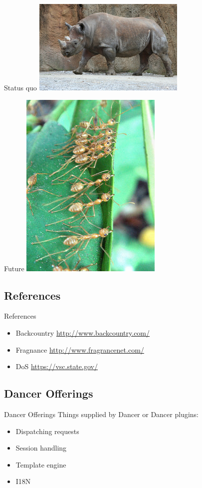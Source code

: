 
\begin{frame}{Status quo}
  \includegraphics{rhino.jpg}
\end{frame}

\begin{frame}{Future}
  \includegraphics{ants.jpg}
\end{frame}

\subsection{References}
\begin{frame}{References}
\begin{itemize}
\item Backcountry \url{http://www.backcountry.com/}
\item Fragnance \url{http://www.fragrancenet.com/}
\item DoS \url{https://vsc.state.gov/}
\end{itemize}
\end{frame}

\subsection{Dancer Offerings}
\begin{frame}{Dancer Offerings}
Things supplied by Dancer or Dancer plugins:

\begin{itemize}
\item Dispatching requests
\item Session handling
\item Template engine
\item I18N
\end{itemize}
\end{frame}

